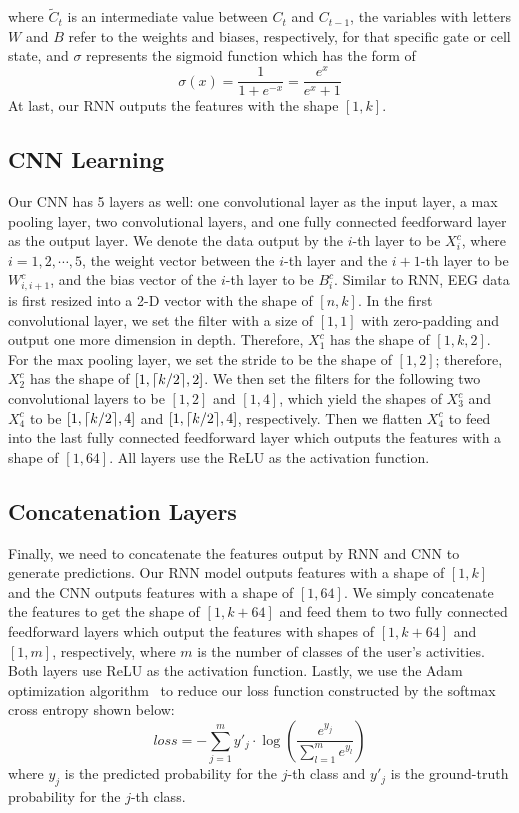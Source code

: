 where $\widetilde{C}_{t}$ is an intermediate value between $C_{t}$ and $C_{t-1}$, the variables with letters $W$ and $B$ refer to the weights and biases, respectively, for that specific gate or cell state, and $\sigma$ represents the sigmoid function which has the form of
\begin{equation}
\sigma(x) = \frac{1}{1+e^{-x}} = \frac{e^{x}}{e^{x} + 1}
\end{equation}
At last, our RNN outputs the features with the shape $[1, k]$. 

\subsection{CNN Learning}
Our CNN has 5 layers as well: one convolutional layer as the input layer, a max pooling layer, two convolutional layers, and one fully connected feedforward layer as the output layer. We denote the data output by the $i$-th layer to be $X_i^{c}$, where $i=1,2,\cdots,5$, the weight vector between the $i$-th layer and the $i+1$-th layer to be $W_{i,i+1}^{c}$, and the bias vector of the $i$-th layer to be $B_{i}^{c}$. Similar to RNN, EEG data is first resized into a 2-D vector with the shape of $[n,k]$. In the first convolutional layer, we set the filter with a size of $[1, 1]$ with zero-padding and output one more dimension in depth. Therefore, $X_1^{c}$ has the shape of $[1, k, 2]$. For the max pooling layer, we set the stride to be the shape of $[1, 2]$; therefore, $X_{2}^{c}$ has the shape of $[1, \lceil k/2\rceil, 2]$. We then set the filters for the following two convolutional layers to be $[1, 2]$ and $[1, 4]$, which yield the shapes of $X_3^{c}$ and $X_4^{c}$ to be $[1, \lceil k/2\rceil, 4]$ and $[1, \lceil k/2\rceil, 4]$, respectively. Then we flatten $X_4^{c}$ to feed into the last fully connected feedforward layer which outputs the features with a shape of $[1, 64]$. All layers use the ReLU as the activation function.

\subsection{Concatenation Layers}
Finally, we need to concatenate the features output by RNN and CNN to generate predictions. Our RNN model outputs features with a shape of $[1, k]$ and the CNN outputs features with a shape of $[1, 64]$. We simply concatenate the features to get the shape of $[1, k + 64]$ and feed them to two fully connected feedforward layers which output the features with shapes of $[1, k+64]$ and $[1, m]$, respectively, where $m$ is the number of classes of the user's activities. Both layers use ReLU as the activation function. Lastly, we use the Adam optimization algorithm~\cite{kingma2014adam} to reduce our loss function constructed by the softmax cross entropy shown below:
\begin{equation}
loss = - \sum_{j=1}^{m} y'_j \cdot \log(\frac{e^{y_j}}{\sum_{l=1}^m e^{y_l}})
\end{equation}
where $y_j$ is the predicted probability for the $j$-th class and $y'_j$ is the ground-truth probability for the $j$-th class.



